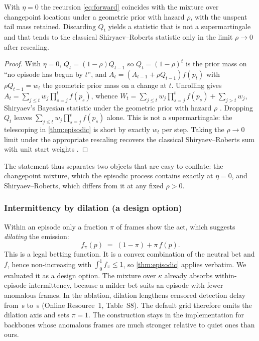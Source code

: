 \begin{proposition}
\label{prop:generalisation}
With $\eta = 0$ the recursion \cref{eq:forward} coincides with the mixture over
changepoint locations under a geometric prior with hazard $\rho$, with the
unspent tail mass retained. Discarding $Q_t$ yields a statistic that is not a
supermartingale and that tends to the classical Shiryaev--Roberts statistic
only in the limit $\rho \to 0$ after rescaling.
\end{proposition}

\begin{proof}
With $\eta = 0$, $Q_t = (1-\rho)Q_{t-1}$ so $Q_t = (1-\rho)^t$ is the prior mass
on ``no episode has begun by $t$'', and
$A_t = (A_{t-1} + \rho Q_{t-1}) f(p_t)$ with $\rho Q_{t-1} = w_t$ the geometric
prior mass on a change at $t$. Unrolling gives
$A_t = \sum_{j \le t} w_j \prod_{s=j}^{t} f(p_s)$, whence
$W_t = \sum_{j\le t} w_j \prod_{s=j}^t f(p_s) + \sum_{j>t} w_j$, Shiryaev's
Bayesian statistic under the geometric prior with hazard $\rho$
\citep{shiryaev1963}. Dropping $Q_t$ leaves $\sum_{j\le t} w_j \prod_{s=j}^t
f(p_s)$ alone. This is not a supermartingale: the telescoping in \cref{thm:episodic} is short by exactly $w_t$ per step. Taking the
$\rho \to 0$ limit under the appropriate rescaling recovers the classical
Shiryaev--Roberts sum with unit start weights \citep{roberts1966}.
\end{proof}

The statement thus separates two objects that are easy to conflate: the changepoint mixture, which the episodic process contains exactly at $\eta=0$, and Shiryaev--Roberts, which differs from it at any fixed $\rho>0$.

\subsubsection{Intermittency by dilation (a design option)}
\label{sec:dilation}

Within an episode only a fraction $\pi$ of frames show the act, which suggests \emph{dilating} the emission:
\begin{equation}
\label{eq:dilated}
  f_\pi(p) \;=\; (1-\pi) + \pi\, f(p).
\end{equation}
This is a legal betting function. It is a convex combination of the neutral bet and $f$, hence non-increasing with $\int_0^1 f_\pi \le 1$, so \cref{thm:episodic} applies verbatim. We evaluated it as a design option. The mixture over $\kappa$ already absorbs within-episode intermittency, because a milder bet suits an episode with fewer anomalous frames. In the ablation, dilation lengthens censored detection delay from \AblFullDelay\,s to \AblDilationDelay\,s (Online Resource~1, Table~S8). The default grid therefore omits the dilation axis and sets $\pi = 1$. The construction stays in the implementation for backbones whose anomalous frames are much stronger relative to quiet ones than ours.

